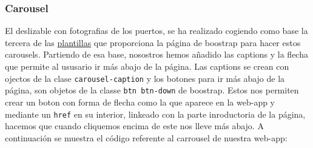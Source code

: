 \documentclass{article}
\begin{document}
\subsubsection{Carousel}
El deslizable con fotografias de los puertos, se ha realizado cogiendo como base la tercera de las \href{https://getbootstrap.com/docs/5.3/components/carousel/}{plantillas} que proporciona la página de boostrap para hacer estos carousels. Partiendo de esa base, nosostros hemos añadido las captions y la flecha que permite al ususario ir más abajo de la página. Las captions se crean con ojectos de la clase \texttt{carousel-caption} y los botones para ir más abajo de la página, son objetos de la classe \texttt{btn btn-down} de boostrap. Estos nos permiten crear un boton con forma de flecha como la que aparece en la web-app y mediante un \texttt{href} en su interior, linkeado con la parte inroductoria de la página, hacemos que cuando cliquemos encima de este nos lleve más abajo. A continuación se muestra el código referente al carrousel de nuestra web-app:
\end{document}
